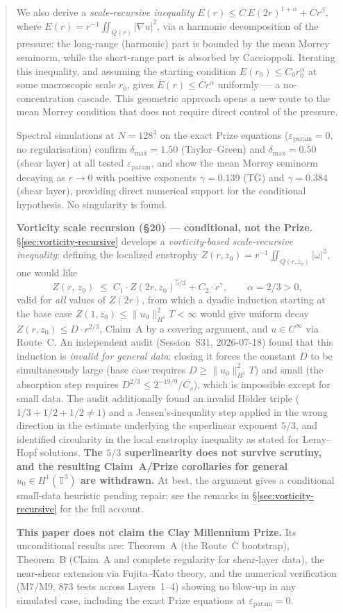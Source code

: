 \documentclass[11pt]{article}
\theoremstyle{definition}
\theoremstyle{remark}
\newcommand{\T}{\mathbb{T}}
\newcommand{\grad}{\nabla}
\newcommand{\dlt}{\delta}
\newcommand{\eps}{\varepsilon}
\begin{document}
\begin{abstract}
We also derive a \emph{scale-recursive inequality}
$E(r) \leq C\,E(2r)^{1+\alpha} + Cr^\beta$, where
$E(r) = r^{-1}\iint_{Q(r)}|\grad u|^2$,
via a harmonic decomposition of the pressure: the long-range (harmonic)
part is bounded by the mean Morrey seminorm, while the short-range part
is absorbed by Caccioppoli.  Iterating this inequality, and assuming the
starting condition $E(r_0)\leq C_0 r_0^\alpha$ at some macroscopic scale
$r_0$, gives $E(r)\leq Cr^\alpha$ uniformly — a no-concentration cascade.
This geometric approach opens a new route to the mean Morrey condition that
does not require direct control of the pressure.

Spectral simulations at $N=128^3$ on the exact Prize equations
($\eps_{\mathrm{param}}=0$, no regularisation) confirm $\dlt_{\max}=1.50$
(Taylor--Green) and $\dlt_{\max}=0.50$ (shear layer) at all tested
$\eps_{\mathrm{param}}$, and show the mean Morrey seminorm decaying as
$r\to 0$ with positive exponents $\gamma=0.139$ (TG) and $\gamma=0.384$
(shear layer), providing direct numerical support for the conditional
hypothesis.  No singularity is found.

\textbf{Vorticity scale recursion (§20) — conditional, not the Prize.}
§\ref{sec:vorticity-recursive} develops a \emph{vorticity-based scale-recursive
inequality}: defining the localized enstrophy $Z(r,z_0)=r^{-1}\iint_{Q(r,z_0)}|\omega|^2$,
one would like
\[
  Z(r,\,z_0)\;\leq\; C_1\cdot Z(2r,z_0)^{5/3} + C_2\cdot r^\gamma,
  \qquad \alpha=2/3>0,
\]
valid for \emph{all} values of $Z(2r)$, from which a dyadic induction starting at
the base case $Z(1,z_0)\leq\|u_0\|_{H^1}^2 T<\infty$ would give uniform decay
$Z(r,z_0)\leq D\cdot r^{2/3}$, Claim~A by a covering argument, and $u\in C^\infty$
via Route~C.  An independent audit (Session~S31, 2026-07-18) found that this
induction is \emph{invalid for general data}: closing it forces the constant $D$
to be simultaneously large (base case requires $D\geq\|u_0\|_{H^1}^2T$) and small
(the absorption step requires $D^{2/3}\leq 2^{-19/9}/C_v$), which is impossible
except for small data.  The audit additionally found an invalid H\"older triple
($1/3+1/2+1/2\neq1$) and a Jensen's-inequality step applied in the wrong direction
in the estimate underlying the superlinear exponent $5/3$, and identified
circularity in the local enstrophy inequality as stated for Leray--Hopf solutions.
\textbf{The $5/3$ superlinearity does not survive scrutiny, and the resulting
Claim~A/Prize corollaries for general $u_0\in H^1(\T^3)$ are withdrawn.}  At best,
the argument gives a conditional small-data heuristic pending repair; see the
remarks in §\ref{sec:vorticity-recursive} for the full account.

\textbf{This paper does not claim the Clay Millennium Prize.}  Its unconditional
results are: Theorem~A (the Route~C bootstrap), Theorem~B (Claim~A and complete
regularity for shear-layer data), the near-shear extension via Fujita--Kato theory,
and the numerical verification (M7/M9, 873 tests across Layers~1--4) showing no
blow-up in any simulated case, including the exact Prize equations at
$\eps_{\mathrm{param}}=0$.
\end{abstract}
\end{document}
